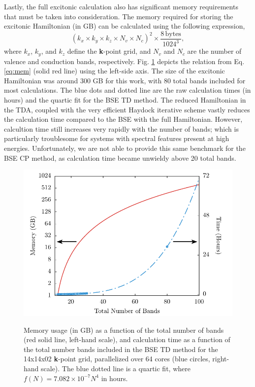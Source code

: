\documentclass[aps,prb,10pt,showpacs,superscriptaddress,twocolumn,notitlepage]{revtex4-1}
\begin{document}
Lastly, the full excitonic calculation also has significant memory requirements
that must be taken into consideration. The memory required for storing the
excitonic Hamiltonian (in GB) can be calculated using the following expression,
\begin{equation}\label{eq:mem}
(k_{x}\times k_{y}\times k_{z}\times N_{v}\times N_{c})^{2} \times
\frac{8\, \mathrm{bytes}}{1024^{3}},
\end{equation}
where $k_{x}$, $k_{y}$, and $k_{z}$ define the \textbf{k}-point grid, and
$N_{v}$ and $N_{c}$ are the number of valence and conduction bands,
respectively. Fig. \ref{fig:bands} depicts the relation from Eq. \eqref{eq:mem}
(solid red line) using the left-side axis. The size of the excitonic Hamiltonian
was around 300 GB for this work, with 80 total bands included for most
calculations. The blue dots and dotted line are the raw calculation times (in
hours) and the quartic fit for the BSE TD method. The reduced Hamiltonian in the
TDA, coupled with the very efficient Haydock iterative scheme vastly reduces the
calculation time compared to the BSE with the full Hamiltonian. However,
calcultion time still increases very rapidly with the number of bands; which is
particularly troublesome for systems with spectral features present at high
energies. Unfortunately, we are not able to provide this same benchmark for the
BSE CP method, as calculation time became unwieldy above 20 total bands.

\begin{figure}[t]
{\includegraphics[width=\linewidth]{fig11}}
\caption{Memory usage (in GB) as a function of the total number of
bands (red solid line, left-hand scale), and calculation time as a function of
the total number bands included in the BSE TD method for the 14x14x02
\textbf{k}-point grid, parallelized over 64 cores (blue circles, right-hand
scale). The blue dotted line is a quartic fit, where $f(N) =
7.082\times10^{-7}N^{4}$ in hours.}
\label{fig:bands}
\end{figure}
\end{document}
